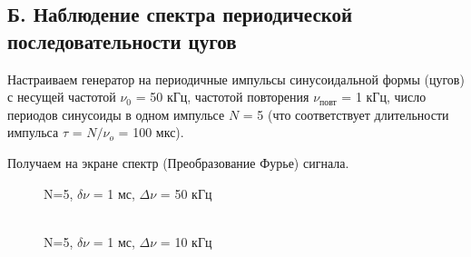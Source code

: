 \documentclass[a4paper,12pt]{article} %
\begin{document}
\begin{enumerate}
\newpage

\subsection*{Б. Наблюдение спектра периодической последовательности цугов}

Настраиваем генератор на периодичные импульсы синусоидальной формы (цугов) с несущей частотой $\nu_0$ = 50 кГц, частотой повторения $\nu_\text{повт}$ = 1 кГц, число периодов синусоиды в одном импульсе $N$ = 5 (что соответствует длительности импульса $\tau$ = $N/\nu_o$ = 100 мкс).

Получаем на экране спектр (Преобразование Фурье) сигнала.


\begin{figure}[h]
\begin{minipage}[h]{0.47\linewidth}
 N=5, $\delta \nu$ = 1 мс, $\Delta \nu$ = 50 кГц\\
\end{minipage}
\hfill
\begin{minipage}[h]{0.47\linewidth}
 \\N=5, $\delta \nu$ = 1 мс, $\Delta \nu$ = 10 кГц

\end{minipage}
\end{figure}
\end{enumerate}
\end{document}
